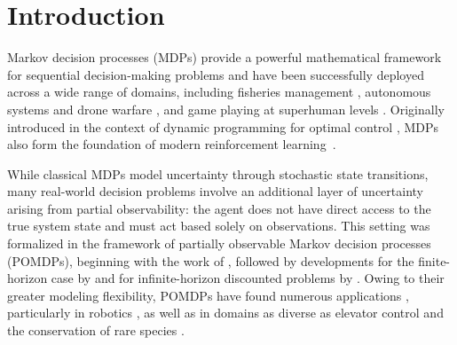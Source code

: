 \documentclass{article}
\theoremstyle{definition}
\theoremstyle{remark}
\begin{document}
\begin{abstract}
We study the geometry of feasible value functions in infinite-horizon partially observable Markov decision processes (POMDPs) under memoryless stochastic policies. Our main contribution is a characterization of the feasible set of value functions as a semi-algebraic set, defined by explicit polynomial inequalities determined by the transition dynamics, observation kernel, and reward structure of the POMDP.
%
This result extends prior work for fully observable Markov decision processes, where the feasible set is known to be a polytope, to the substantially more intricate partially observable setting. In contrast to the polyhedral structure arising in MDPs, partial observability induces fundamentally nonlinear constraints, leading to a richer and more complex geometric structure.
%
Our geometric characterization provides new insight into the landscape of policy optimization in both MDPs and POMDPs, and reveals qualitative phenomena unique to partial observability, including the emergence of isolated local maximizers of the long-term reward and their dependence on the initial state distribution.
\end{abstract}

\section{Introduction}
\label{sec:introduction}

Markov decision processes (MDPs) provide a powerful mathematical framework for sequential decision-making problems and have been successfully deployed across a wide range of domains, including fisheries management \cite{whiteSurveyApplicationsMarkov1993}, autonomous systems and drone warfare \cite{zhangAdaptiveCollisionAvoidance2023}, and game playing at superhuman levels \cite{silverMasteringGameGo2017}. 
%
Originally introduced in the context of dynamic programming for optimal control \cite{bellmanMarkovianDecisionProcess1957}, MDPs also form the foundation of modern reinforcement learning~\cite{suttonReinforcementLearningIntroduction2018}.

While classical MDPs model uncertainty through stochastic state transitions, many real-world decision problems involve an additional layer of uncertainty arising from partial observability: the agent does not have direct access to the true system state and must act based solely on observations. This setting was formalized in the framework of partially observable Markov decision processes (POMDPs), beginning with the work of \citet{astromOptimalControlMarkov1965}, followed by developments for the finite-horizon case by \citet{smallwoodOptimalControlPartially1973} and for infinite-horizon discounted problems by \citet{sondikOptimalControlPartially1978}. 
Owing to their greater modeling flexibility, POMDPs have found numerous applications \citep{cassandraSurveyPomdpApplications1998}, particularly in robotics \citep{lauriPartiallyObservableMarkov2023}, as well as in domains as diverse as elevator control \citep{critesElevatorGroupControl1998} and the conservation of rare species \citep{chadesPrimerPartiallyObservable2021}. 
\end{document}
